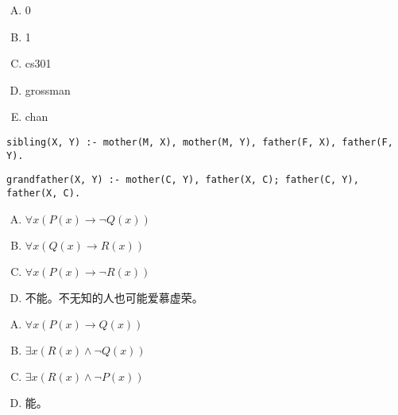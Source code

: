{{        %
        \begin{practices}
            \begin{enumerate}[A.]
                \item 0
                \item 1
                \item cs301
                \item grossman
                \item chan
            \end{enumerate}
        \end{practices}

        \begin{practices}
            \begin{codelist}
                \begin{lstlisting}
sibling(X, Y) :- mother(M, X), mother(M, Y), father(F, X), father(F, Y).
                \end{lstlisting}
            \end{codelist}
        \end{practices}

        \begin{practices}
            \begin{codelist}
                \begin{lstlisting}
grandfather(X, Y) :- mother(C, Y), father(X, C); father(C, Y), father(X, C).
                \end{lstlisting}
            \end{codelist}
        \end{practices}

        \begin{practices}
            \begin{enumerate}[A.]
                \item $\forall x (P(x) \rightarrow \neg Q(x))$
                \item $\forall x (Q(x) \rightarrow R(x))$
                \item $\forall x (P(x) \rightarrow \neg R(x))$
                \item 不能。不无知的人也可能爱慕虚荣。
            \end{enumerate}
        \end{practices}

        \begin{practices}
            \begin{enumerate}[A.]
                \item $\forall x (P(x) \rightarrow Q(x))$
                \item $\exists x (R(x) \wedge \neg Q(x))$
                \item $\exists x (R(x) \wedge \neg P(x))$
                \item 能。
            \end{enumerate}
        \end{practices}

}}
